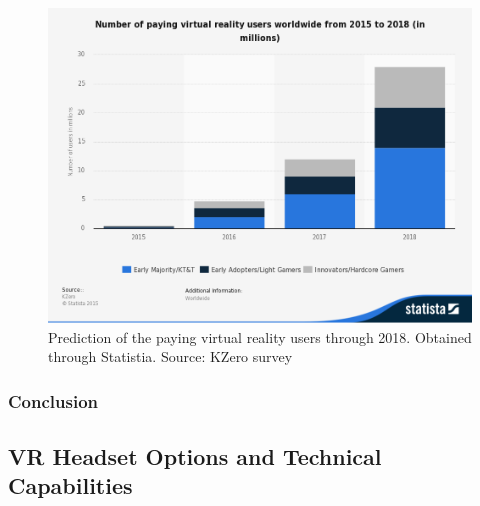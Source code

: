 \documentclass[a4paper,10pt]{article}
\begin{document}
\begin{figure}[H]
	\centerline{\includegraphics[scale = 0.25]{statPay.png}}
	\caption{Prediction of the paying virtual reality users through 2018.  Obtained through Statistia.  Source: KZero survey}
	\label{fig:moneyStats}
\end{figure}
\subsubsection{Conclusion}
\pagebreak
\subsection{VR Headset Options and Technical Capabilities}
\end{document}
